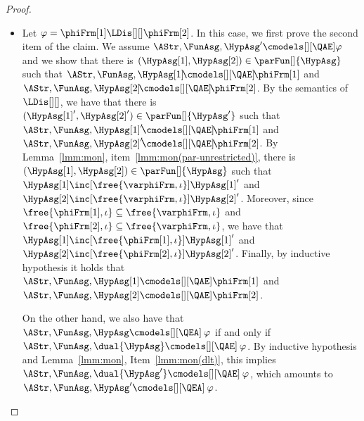 \documentclass[authoryear]{elsarticle}
\begin{document}
\begin{proof}
\begin{itemize}
  \item Let $\varphi = \phiFrm[1] \LDis[][] \phiFrm[2]$.
    In this case, we first prove the second item of the claim.
    We assume $\AStr, \FunAsg, \HypAsg' \cmodels[][\QAE] \varphi$ and we show
    that there is $(\HypAsg[1], \HypAsg[2]) \in \parFun[]{\HypAsg}$ such that
    $\AStr, \FunAsg, \HypAsg[1] \!\cmodels[][\QAE]\! \phiFrm[1]$ and $\AStr,
    \FunAsg, \HypAsg[2] \!\cmodels[][\QAE]\! \phiFrm[2]$.
%
    By the semantics of $\LDis[][]$, we have that there is $(\HypAsg[1]',
    \HypAsg[2]') \in \parFun[]{\HypAsg'}$ such that $\AStr, \FunAsg, \HypAsg[1]'
    \!\cmodels[][\QAE]\! \phiFrm[1]$ and $\AStr, \FunAsg, \HypAsg[2]'
    \!\cmodels[][\QAE]\! \phiFrm[2]$.
%
    By Lemma~\ref{lmm:mon}, item~\ref{lmm:mon(par-unrestricted)}, there is
    $(\HypAsg[1], \HypAsg[2]) \in \parFun[]{\HypAsg}$ such that $\HypAsg[1]
    \inc[\free{\varphiFrm,\iota}] \HypAsg[1]'$ and $\HypAsg[2]
    \inc[\free{\varphiFrm,\iota}] \HypAsg[2]'$.
%
    Moreover, since $\free{\phiFrm[1],\iota} \subseteq \free{\varphiFrm,\iota}$
    and $\free{\phiFrm[2],\iota} \subseteq \free{\varphiFrm,\iota}$, we have
    that $\HypAsg[1] \inc[\free{\phiFrm[1],\iota}] \HypAsg[1]'$ and $\HypAsg[2]
    \inc[\free{\phiFrm[2],\iota}] \HypAsg[2]'$.
%
    Finally, by inductive hypothesis it holds that $\AStr, \FunAsg, \HypAsg[1]
    \cmodels[][\QAE] \phiFrm[1]$ and $\AStr, \FunAsg, \HypAsg[2]
    \cmodels[][\QAE] \phiFrm[2]$.

    On the other hand, we also have that $\AStr, \FunAsg, \HypAsg
    \cmodels[][\QEA]\: \varphi$ if and only if $\AStr, \FunAsg, \dual{\HypAsg}
    \cmodels[][\QAE]\: \varphi$.
    By inductive hypothesis and Lemma~\ref{lmm:mon}, Item~\ref{lmm:mon(dlt)},
    this implies $\AStr, \FunAsg, \dual{\HypAsg'} \cmodels[][\QAE]\: \varphi$,
    which amounts to $\AStr, \FunAsg, \HypAsg' \cmodels[][\QEA]\: \varphi$.


\end{itemize}
\end{proof}
\end{document}
